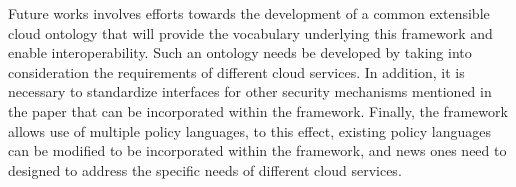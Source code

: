 \documentclass[times, 10pt,twocolumn]{article}
\begin{document}
Future works involves efforts towards the development of a common extensible cloud ontology that will provide the vocabulary underlying this framework and enable interoperability. Such an ontology needs be developed by taking into consideration the requirements of different cloud services. In addition, it is necessary to standardize interfaces for other security mechanisms mentioned in the paper that can be incorporated within the framework. Finally, the framework allows use of multiple policy languages, to this effect, existing policy languages can be modified to be incorporated within the framework, and news ones need to designed to address the specific needs of different cloud services.





\end{document}
